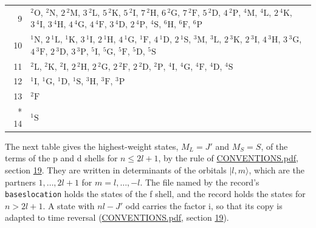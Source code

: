 \documentclass[10pt,a4paper]{article}
\numberwithin{equation}{section}
\newcommand{\spec}[1]{\mathrm{#1}}
\newcommand{\iunit}{\mathrm{i}}
\newcommand{\ket}[1]{\lvert #1\rangle}
\newcommand{\term}[2]{{}^{#1}#2}
\newlength{\fillwidth}\newlength{\cellwidth}\newlength{\colwidth}
\begin{document}
{\begin{longtable}{@{}r>{\RaggedRight\arraybackslash}p{\fillwidth}@{}}
9 & $\term{2}{\spec{O}}$, $\term{2}{\spec{N}}$, $2\,\term{2}{\spec{M}}$, $3\,\term{2}{\spec{L}}$, $5\,\term{2}{\spec{K}}$, $5\,\term{2}{\spec{I}}$, $7\,\term{2}{\spec{H}}$, $6\,\term{2}{\spec{G}}$, $7\,\term{2}{\spec{F}}$, $5\,\term{2}{\spec{D}}$, $4\,\term{2}{\spec{P}}$, $\term{4}{\spec{M}}$, $\term{4}{\spec{L}}$, $2\,\term{4}{\spec{K}}$, $3\,\term{4}{\spec{I}}$, $3\,\term{4}{\spec{H}}$, $4\,\term{4}{\spec{G}}$, $4\,\term{4}{\spec{F}}$, $3\,\term{4}{\spec{D}}$, $2\,\term{4}{\spec{P}}$, $\term{4}{\spec{S}}$, $\term{6}{\spec{H}}$, $\term{6}{\spec{F}}$, $\term{6}{\spec{P}}$\\
10 & $\term{1}{\spec{N}}$, $2\,\term{1}{\spec{L}}$, $\term{1}{\spec{K}}$, $3\,\term{1}{\spec{I}}$, $2\,\term{1}{\spec{H}}$, $4\,\term{1}{\spec{G}}$, $\term{1}{\spec{F}}$, $4\,\term{1}{\spec{D}}$, $2\,\term{1}{\spec{S}}$, $\term{3}{\spec{M}}$, $\term{3}{\spec{L}}$, $2\,\term{3}{\spec{K}}$, $2\,\term{3}{\spec{I}}$, $4\,\term{3}{\spec{H}}$, $3\,\term{3}{\spec{G}}$, $4\,\term{3}{\spec{F}}$, $2\,\term{3}{\spec{D}}$, $3\,\term{3}{\spec{P}}$, $\term{5}{\spec{I}}$, $\term{5}{\spec{G}}$, $\term{5}{\spec{F}}$, $\term{5}{\spec{D}}$, $\term{5}{\spec{S}}$\\
11 & $\term{2}{\spec{L}}$, $\term{2}{\spec{K}}$, $\term{2}{\spec{I}}$, $2\,\term{2}{\spec{H}}$, $2\,\term{2}{\spec{G}}$, $2\,\term{2}{\spec{F}}$, $2\,\term{2}{\spec{D}}$, $\term{2}{\spec{P}}$, $\term{4}{\spec{I}}$, $\term{4}{\spec{G}}$, $\term{4}{\spec{F}}$, $\term{4}{\spec{D}}$, $\term{4}{\spec{S}}$\\
12 & $\term{1}{\spec{I}}$, $\term{1}{\spec{G}}$, $\term{1}{\spec{D}}$, $\term{1}{\spec{S}}$, $\term{3}{\spec{H}}$, $\term{3}{\spec{F}}$, $\term{3}{\spec{P}}$\\
13 & $\term{2}{\spec{F}}$\\*
14 & $\term{1}{\spec{S}}$\\
\bottomrule\end{longtable}}
\leavevmode\label{n:local.orbital.projection}\label{n:local.spin.projection}The next table gives the highest-weight states, $M_L = J'$ and $M_S = S$, of the terms of the p and d shells for $n \le 2l + 1$, by the rule of \href{../../CONVENTIONS.pdf}{CONVENTIONS.pdf}, section \href{../../CONVENTIONS.pdf\#conv.19}{19}. They are written in determinants of the orbitals $\ket{l, m}$, which are the partners $1, \dots, 2l + 1$ for $m = l, \dots, -l$. The file named by the record's \texttt{baseslocation} holds the states of the f shell, and the record holds the states for $n > 2l + 1$. A state with $nl - J'$ odd carries the factor $\iunit$, so that its copy is adapted to time reversal (\href{../../CONVENTIONS.pdf}{CONVENTIONS.pdf}, section \href{../../CONVENTIONS.pdf\#conv.19}{19}).
\end{document}
